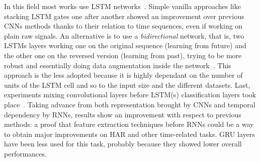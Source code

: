 In this field most works use LSTM networks~\cite{Guan-LSTM-wearables}.
Simple vanilla approaches like stacking LSTM gates one after another showed an improvement over previous CNNs methods thanks to their relation to time sequences, even if working on plain raw signals. 
An alternative is to use a \textit{bidirectional} network, that is, two LSTMs layers working one on the original sequence (learning from future) and the other one on the reversed version (learning from past), trying to be more robust and essentially doing data augmentation inside the network~\cite{Hammerla-DeepConvRec}.
This approach is the less adopted because it is highly dependant on the number of units of the LSTM cell and so to the input size and the different datasets.
Last, experiments mixing convolutional layers before LSTM(s) classification layers took place~\cite{Ordonez-CNN-LSTM}.
Taking advance from both representation brought by CNNs and temporal dependency by RNNs, results show an improvement with respect to previous methods: a proof that feature extraction techniques before RNNs could be a way to obtain major improvements on HAR and other time-related tasks. 
GRU layers have been less used for this task, probably because they showed lower overall performances\cite{Park-DNN-smartmultisensor,Arifoglu-RNN-HAR}.

